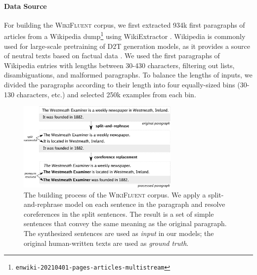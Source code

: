 \paragraph{Data Source} For building the \textsc{WikiFluent} corpus, we first extracted 934k first paragraphs of articles from a Wikipedia dump\footnote{\texttt{enwiki-20210401-pages-articles-multistream}} using WikiExtractor \cite{Wikiextractor2015}. Wikipedia is commonly used for large-scale pretraining of D2T generation models, as it provides a source of neutral texts based on factual data \cite{jinGenWikiDatasetMillion2020,chenKGPTKnowledgeGroundedPreTraining2020}.
We used the first paragraphs of Wikipedia entries with lengths between 30-430 characters, filtering out lists, disambiguations, and malformed paragraphs. To balance the lengths of inputs, we divided the paragraphs according to their length into four equally-sized bins (30-130 characters, etc.) and selected 250k examples from each bin.



\begin{figure}[t]
    \centering
    \includegraphics[width=0.7\textwidth]{img/wikifluent.pdf}
    \caption{The building process of the \textsc{WikiFluent} corpus. We apply a split-and-rephrase model on each sentence in the paragraph and resolve coreferences in the split sentences. The result is a set of simple sentences that convey the same meaning as the original paragraph. The synthesized sentences are used as \textit{input} in our models; the original human-written texts are used as \textit{ground truth}.}\label{fig:wikifluent}
\end{figure}

